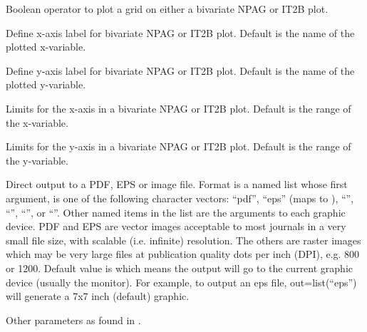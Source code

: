 \documentclass[a4paper]{book}
\begin{document}
\begin{Arguments}
\begin{ldescription}
\item[\code{grid}] Boolean operator to plot a grid on either a bivariate NPAG or IT2B plot.

\item[\code{xlab}] Define x-axis label for bivariate NPAG or IT2B plot.  Default is the name of the plotted x-variable.

\item[\code{ylab}] Define y-axis label for bivariate NPAG or IT2B plot.  Default is the name of the plotted y-variable.

\item[\code{xlim}] Limits for the x-axis in a bivariate NPAG or IT2B plot.  Default is the range of the x-variable.

\item[\code{ylim}] Limits for the y-axis in a bivariate NPAG or IT2B plot.  Default is the range of the y-variable.

\item[\code{out}] Direct output to a PDF, EPS or image file.  Format is a named list whose first argument, 
 is one of the following character vectors: ``pdf'', ``eps'' (maps to ),
``'', ``'', ``'', or ``''.  Other named items in the list
are the arguments to each graphic device. PDF and EPS are vector images acceptable to most journals
in a very small file size, with scalable (i.e. infinite) resolution.  The others are raster images which may be very
large files at publication quality dots per inch (DPI), e.g. 800 or 1200. Default value is  which means the 
output will go to the current graphic device (usually the monitor). For example, to output an eps file,
out=list(``eps'') will generate a 7x7 inch (default) graphic.

\item[\code{...}] Other parameters as found in .
\end{ldescription}
\end{Arguments}
%
\end{document}
